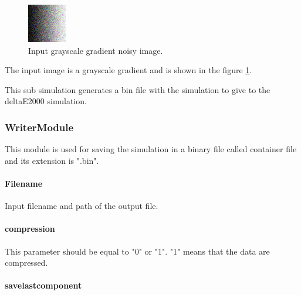 \begin{figure}[!htb]
\begin{center}
\includegraphics[width=0.5\columnwidth]{./04_DeltaE2000Module/images/24RGBLNoise.png}
\caption{Input grayscale gradient noisy image.}\label{fig:gradientRGBdeltaENoisy}
\end{center}
\end{figure}

The input image is a grayscale gradient and is shown in the figure \ref{fig:gradientRGBdeltaENoisy}.

This sub simulation generates a bin file with the simulation to give to the deltaE2000 simulation.

\subsubsection{WriterModule}

This module is used for saving the simulation in a binary file called container file and its extension is ".bin".

\paragraph{Filename}

Input filename and path of the output file.

\paragraph{compression}

This parameter should be equal to "0" or "1". "1" means that the data are compressed.

\paragraph{savelastcomponent}

